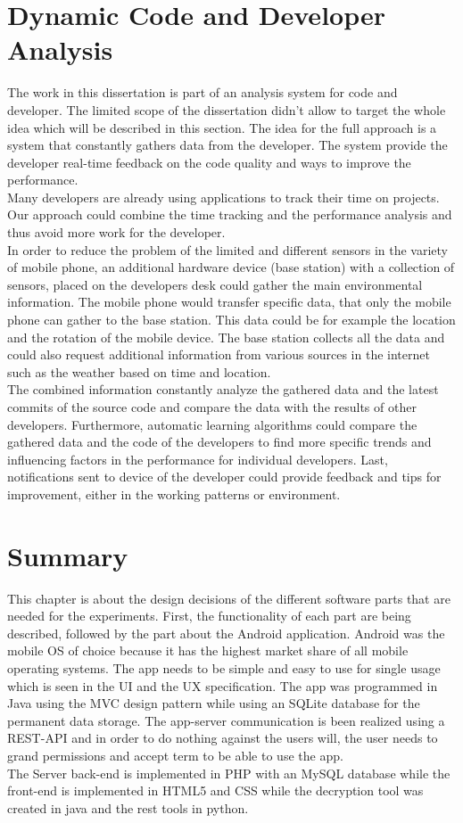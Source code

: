 \section{Dynamic Code and Developer Analysis}
The work in this dissertation is part of an analysis system for code and developer. The limited scope of the dissertation didn't allow to target the whole idea which will be described in this section. 
\bigbreak
The idea for the full approach is a system that constantly gathers data from the developer. The system provide the developer real-time feedback on the code quality and ways to improve the performance.\\
Many developers are already using applications to track their time on projects. Our approach could combine the time tracking and the performance analysis and thus avoid more work for the developer. \\
In order to reduce the problem of the limited and different sensors in the variety of mobile phone, an additional hardware device (base station) with a collection of sensors, placed on the developers desk could gather the main environmental information. The mobile phone would transfer specific data, that only the mobile phone can gather to the base station. This data could be for example the location and the rotation of the mobile device. The base station collects all the data and could also request additional information from various sources in the internet such as the weather based on time and location.\\
The combined information constantly analyze the gathered data and the latest commits of the source code and compare the data with the results of other developers. Furthermore, automatic learning algorithms could compare the gathered data and the code of the developers to find more specific trends and influencing factors in the performance for individual developers. 
Last, notifications sent to device of the developer could provide feedback and tips for improvement, either in the working patterns or environment. 

\section{Summary}
This chapter is about the design decisions of the different software parts that are needed for the experiments. First, the functionality of each part are being described, followed by the part about the Android application. Android was the mobile OS of choice because it has the highest market share of all mobile operating systems. The app needs to be simple and easy to use for single usage which is seen in the UI and the UX specification. 
The app was programmed in Java using the MVC design pattern while using an SQLite database for the permanent data storage. The app-server communication is been realized using a REST-API and in order to do nothing against the users will, the user needs to grand permissions and accept term to be able to use the app. \\
The Server back-end is implemented in PHP with an MySQL database while the front-end is implemented in HTML5 and CSS while the decryption tool was created in java and the rest tools in python. 
